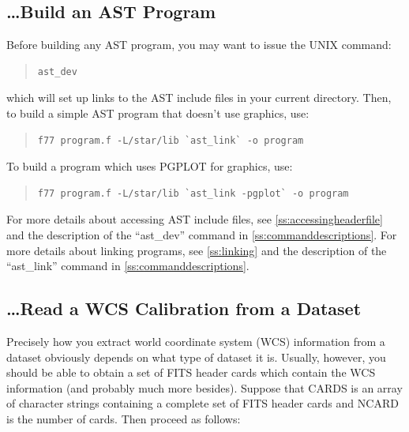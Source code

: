 \documentclass[twoside,11pt]{article}
\newcommand{\htmlref}[2]{#1}
\newcommand{\appref}[1]{Appendix~\ref{#1}}
\newcommand{\secref}[1]{\S\ref{#1}}
\renewcommand{\appref}[1]{\ref{#1}}
\renewcommand{\secref}[1]{\ref{#1}}
\begin{document}
\subsection{\label{ss:howtobuild}\ldots Build an AST Program}

Before building any AST program, you may want to issue the UNIX command:

\begin{quote}
\small
\begin{verbatim}
ast_dev
\end{verbatim}
\normalsize
\end{quote}

which will set up links to the AST include files in your current
directory.  Then, to build a simple AST program that doesn't use
graphics, use:

\begin{quote}
\small
\begin{verbatim}
f77 program.f -L/star/lib `ast_link` -o program
\end{verbatim}
\normalsize
\end{quote}

To build a program which uses PGPLOT for graphics, use:

\begin{quote}
\small
\begin{verbatim}
f77 program.f -L/star/lib `ast_link -pgplot` -o program
\end{verbatim}
\normalsize
\end{quote}

For more details about accessing AST include files, see
\secref{ss:accessingheaderfile} and the description of the
``\htmlref{ast\_dev}{ast_dev}'' command in \appref{ss:commanddescriptions}.  For more
details about linking programs, see \secref{ss:linking} and the
description of the ``\htmlref{ast\_link}{ast_link}'' command in
\appref{ss:commanddescriptions}.

\subsection{\label{ss:howtoreadwcs}\ldots Read a WCS Calibration from a Dataset}

Precisely how you extract world coordinate system (WCS) information
from a dataset obviously depends on what type of dataset it
is. Usually, however, you should be able to obtain a set of FITS
header cards which contain the WCS information (and probably much more
besides). Suppose that CARDS is an array of character strings
containing a complete set of FITS header cards and NCARD is the number
of cards. Then proceed as follows:
\end{document}
